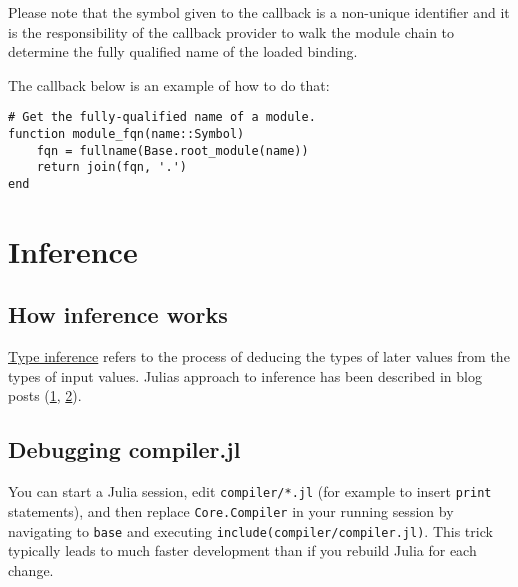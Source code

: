 Please note that the symbol given to the callback is a non-unique identifier and it is the responsibility of the callback provider to walk the module chain to determine the fully qualified name of the loaded binding.



The callback below is an example of how to do that:




\begin{verbatim}
# Get the fully-qualified name of a module.
function module_fqn(name::Symbol)
    fqn = fullname(Base.root_module(name))
    return join(fqn, '.')
end
\end{verbatim}



\hypertarget{582051353723326392}{}


\section{Inference}



\hypertarget{7885214660101366687}{}


\subsection{How inference works}



\href{https://en.wikipedia.org/wiki/Type\_inference}{Type inference} refers to the process of deducing the types of later values from the types of input values. Julia{\textquotesingle}s approach to inference has been described in blog posts (\href{https://juliacomputing.com/blog/2016/04/04/inference-convergence.html}{1}, \href{https://juliacomputing.com/blog/2017/05/15/inference-converage2.html}{2}).



\hypertarget{5858996762602267783}{}


\subsection{Debugging compiler.jl}



You can start a Julia session, edit \texttt{compiler/*.jl} (for example to insert \texttt{print} statements), and then replace \texttt{Core.Compiler} in your running session by navigating to \texttt{base} and executing \texttt{include({\textquotedbl}compiler/compiler.jl{\textquotedbl})}. This trick typically leads to much faster development than if you rebuild Julia for each change.



